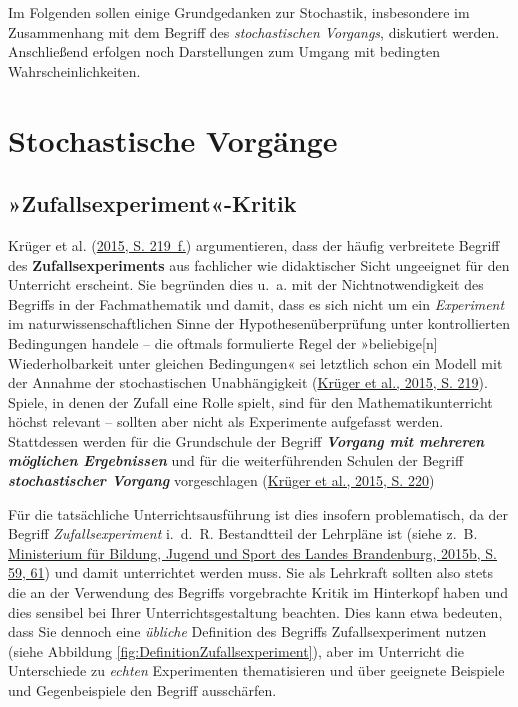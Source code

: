 \documentclass[
]{scrbook}
\theoremstyle{definition}
\theoremstyle{definition}
\theoremstyle{definition}
\theoremstyle{definition}
\theoremstyle{remark}
\begin{document}
Im Folgenden sollen einige Grundgedanken zur Stochastik, insbesondere im Zusammenhang mit dem Begriff des \emph{stochastischen Vorgangs}, diskutiert werden. Anschließend erfolgen noch Darstellungen zum Umgang mit bedingten Wahrscheinlichkeiten.

\hypertarget{stochastische-vorguxe4nge}{%
\section{Stochastische Vorgänge}\label{stochastische-vorguxe4nge}}

\hypertarget{zufallsexperiment-kritik}{%
\subsection{»Zufallsexperiment«-Kritik}\label{zufallsexperiment-kritik}}

Krüger et al. (\protect\hyperlink{ref-Kruger2015}{2015, S. 219~f.}) argumentieren, dass der häufig verbreitete Begriff des \textbf{Zufallsexperiments} aus fachlicher wie didaktischer Sicht ungeeignet für den Unterricht erscheint. Sie begründen dies u.~a. mit der Nichtnotwendigkeit des Begriffs in der Fachmathematik und damit, dass es sich nicht um ein \emph{Experiment} im naturwissenschaftlichen Sinne der Hypothesenüberprüfung unter kontrollierten Bedingungen handele -- die oftmals formulierte Regel der »beliebige{[}n{]} Wiederholbarkeit unter gleichen Bedingungen« sei letztlich schon ein Modell mit der Annahme der stochastischen Unabhängigkeit (\protect\hyperlink{ref-Kruger2015}{Krüger et al., 2015, S. 219}). Spiele, in denen der Zufall eine Rolle spielt, sind für den Mathematikunterricht höchst relevant -- sollten aber nicht als Experimente aufgefasst werden. Stattdessen werden für die Grundschule der Begriff \textbf{\emph{Vorgang mit mehreren möglichen Ergebnissen}} und für die weiterführenden Schulen der Begriff \textbf{\emph{stochastischer Vorgang}} vorgeschlagen (\protect\hyperlink{ref-Kruger2015}{Krüger et al., 2015, S. 220})

Für die tatsächliche Unterrichtsausführung ist dies insofern problematisch, da der Begriff \emph{Zufallsexperiment} i.~d.~R. Bestandtteil der Lehrpläne ist (siehe z.~B. \protect\hyperlink{ref-MinisteriumfurBildungJugendundSportdesLandesBrandenburg2015a}{Ministerium für Bildung, Jugend und Sport des Landes Brandenburg, 2015b, S. 59, 61}) und damit unterrichtet werden muss. Sie als Lehrkraft sollten also stets die an der Verwendung des Begriffs vorgebrachte Kritik im Hinterkopf haben und dies sensibel bei Ihrer Unterrichtsgestaltung beachten. Dies kann etwa bedeuten, dass Sie dennoch eine \emph{übliche} Definition des Begriffs Zufallsexperiment nutzen (siehe Abbildung \ref{fig:DefinitionZufallsexperiment}), aber im Unterricht die Unterschiede zu \emph{echten} Experimenten thematisieren und über geeignete Beispiele und Gegenbeispiele den Begriff ausschärfen.
\end{document}
